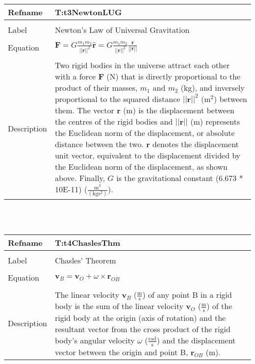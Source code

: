 \documentclass[12pt]{article}
\begin{document}
\noindent \begin{minipage}{\textwidth}
\begin{tabular}{p{} p{}}
\toprule \textbf{Refname} & \textbf{T:t3NewtonLUG}
\label{T:t3NewtonLUG}
\\ \midrule \\
Label & Newton's Law of Universal Gravitation
\\ \midrule \\
Equation & $\mathbf{F}=G \frac{{m_{1}} {m_{2}}}{||\mathbf{r}||^{2}} \mathbf{\hat{r}}=G \frac{{m_{1}} {m_{2}}}{||\mathbf{r}||^{2}} \frac{\mathbf{r}}{||\mathbf{r}||}$
\\ \midrule \\
Description & Two rigid bodies in the universe attract each other with a force $\mathbf{F}$ (N) that is directly proportional to the product of their masses, ${m_{1}}$ and ${m_{2}}$ (kg), and inversely proportional to the squared distance ${||\mathbf{r}||^{2}}$ ($\text{m}^{2}$) between them. The vector $\mathbf{r}$ (m) is the displacement between the centres of the rigid bodies and $||\mathbf{r}||$ (m) represents the Euclidean norm of the displacement, or absolute distance between the two. $\mathbf{\hat{r}}$ denotes the displacement unit vector, equivalent to the displacement divided by the Euclidean norm of the displacement, as shown above. Finally, $G$ is the gravitational constant (6.673 * 10E-11) ($\frac{\text{m}^{3}}{(\text{kg}\text{s}^{2})}$).
\\ \bottomrule \end{tabular}
\end{minipage}\\
~\newline
\noindent \begin{minipage}{\textwidth}
\begin{tabular}{p{} p{}}
\toprule \textbf{Refname} & \textbf{T:t4ChaslesThm}
\label{T:t4ChaslesThm}
\\ \midrule \\
Label & Chasles' Theorem
\\ \midrule \\
Equation & ${\mathbf{v}_{B}}={\mathbf{v}_{O}}+\omega{}\times{\mathbf{r}_{OB}}$
\\ \midrule \\
Description & The linear velocity ${\mathbf{v}_{B}}$ ($\frac{\text{m}}{\text{s}}$) of any point B in a rigid body is the sum of the linear velocity ${\mathbf{v}_{O}}$ ($\frac{\text{m}}{\text{s}}$) of the rigid body at the origin (axis of rotation) and the resultant vector from the cross product of the rigid body's angular velocity $\omega{}$ ($\frac{\text{rad}}{\text{s}}$) and the displacement vector between the origin and point B, ${\mathbf{r}_{OB}}$ (m).
\\ \bottomrule \end{tabular}
\end{minipage}\\
\end{document}
